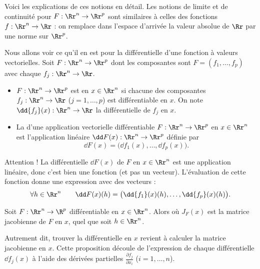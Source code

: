\documentclass[11pt, class=report,crop=false]{standalone}
\begin{document}
\bigskip

Voici les explications de ces notions en détail.
Les notions de limite et de continuité pour $F : \Rr^n \to \Rr^p$ sont similaires à celles des fonctions $f : \Rr^n \to \Rr$ : on remplace dans l'espace d'arrivée la valeur absolue de $\Rr$ par une norme sur $\Rr^p$.


Nous allons voir ce qu'il en est pour la différentielle d'une fonction à valeurs vectorielles. Soit $F : \Rr^n \to \Rr^p$ dont les composantes sont $F = (f_1,\ldots,f_p)$ avec chaque $f_j : \Rr^n \to \Rr$.
 

\begin{definition}
\sauteligne
\begin{itemize}
  \item $F : \Rr^n \to \Rr^p$ est  en $x \in \Rr^n$ si chacune des composantes   $f_j : \Rr^n \to \Rr$ ($j=1,\ldots,p$) est différentiable en $x$.
  On note $\dd {f_j} (x) : \Rr^n \to \Rr$ la différentielle de $f_j$ en $x$.

  \item La  d'une application vectorielle différentiable $F : \Rr^n \to \Rr^p$ en $x \in \Rr^n$ est l'application linéaire $\dd F(x) : \Rr^n \to \Rr^p$ définie par 
$$\dd F (x) = \big( \dd {f_1} (x), \ldots, \dd {f_p} (x) \big).$$ 
\end{itemize}
\end{definition}


Attention ! La différentielle $\dd F(x)$ de $F$ en $x \in \Rr^n$ est une application linéaire, donc c'est bien une fonction (et pas un vecteur).
L'évaluation de cette fonction donne une expression avec des vecteurs :
$$\forall h \in \Rr^n \qquad \dd F(x)(h) = \big( \dd {f_1} (x)(h), \ldots, \dd {f_p} (x)(h) \big).$$ 


\begin{proposition}
Soit $F : \Rr^n \to \R^p$ différentiable en $x \in \Rr^n$. Alors
où $J_F (x)$ est la matrice jacobienne de $F$ en $x$, quel que soit $h\in\Rr^n$.
\end{proposition}


Autrement dit, trouver la différentielle en $x$ revient à calculer la matrice jacobienne en $x$. Cette proposition découle de l'expression de chaque différentielle $\dd f_j(x)$ à l'aide des dérivées partielles $\frac{\partial f_j}{\partial x_i}$ ($i=1,\ldots,n$).
\end{document}
